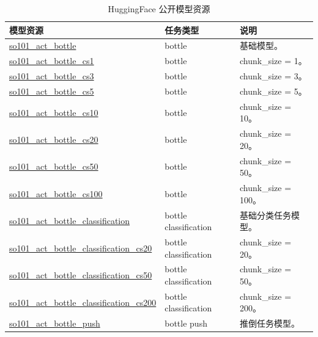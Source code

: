 \begin{appendices}
\begin{table}[htbp]
  \centering
  \caption{HuggingFace 公开模型资源}
  \label{tab:hf-models}
  \small
  \begin{tabularx}{\textwidth}{@{}p{}p{}X@{}}
    \toprule
    模型资源 & 任务类型 & 说明 \\
    \midrule
    \href{https://huggingface.co/Vel044/so101_act_bottle}{so101\_act\_bottle}
      & bottle
      & 基础模型。 \\
    \href{https://huggingface.co/Vel044/so101_act_bottle_cs1}{so101\_act\_bottle\_cs1}
      & bottle
      & chunk\_size = 1。 \\
    \href{https://huggingface.co/Vel044/so101_act_bottle_cs3}{so101\_act\_bottle\_cs3}
      & bottle
      & chunk\_size = 3。 \\
    \href{https://huggingface.co/Vel044/so101_act_bottle_cs5}{so101\_act\_bottle\_cs5}
      & bottle
      & chunk\_size = 5。 \\
    \href{https://huggingface.co/Vel044/so101_act_bottle_cs10}{so101\_act\_bottle\_cs10}
      & bottle
      & chunk\_size = 10。 \\
    \href{https://huggingface.co/Vel044/so101_act_bottle_cs20}{so101\_act\_bottle\_cs20}
      & bottle
      & chunk\_size = 20。 \\
    \href{https://huggingface.co/Vel044/so101_act_bottle_cs50}{so101\_act\_bottle\_cs50}
      & bottle
      & chunk\_size = 50。 \\
    \href{https://huggingface.co/Vel044/so101_act_bottle_cs100}{so101\_act\_bottle\_cs100}
      & bottle
      & chunk\_size = 100。 \\
    \midrule
    \href{https://huggingface.co/Vel044/so101_act_bottle_classification}{so101\_act\_bottle\_classification}
      & bottle classification
      & 基础分类任务模型。 \\
    \href{https://huggingface.co/Vel044/so101_act_bottle_classification_cs20}{so101\_act\_bottle\_classification\_cs20}
      & bottle classification
      & chunk\_size = 20。 \\
    \href{https://huggingface.co/Vel044/so101_act_bottle_classification_cs50}{so101\_act\_bottle\_classification\_cs50}
      & bottle classification
      & chunk\_size = 50。 \\
    \href{https://huggingface.co/Vel044/so101_act_bottle_classification_cs200}{so101\_act\_bottle\_classification\_cs200}
      & bottle classification
      & chunk\_size = 200。 \\
    \midrule
    \href{https://huggingface.co/Vel044/so101_act_bottle_push}{so101\_act\_bottle\_push}
      & bottle push
      & 推倒任务模型。 \\
    \bottomrule
  \end{tabularx}
\end{table}


\end{appendices}
